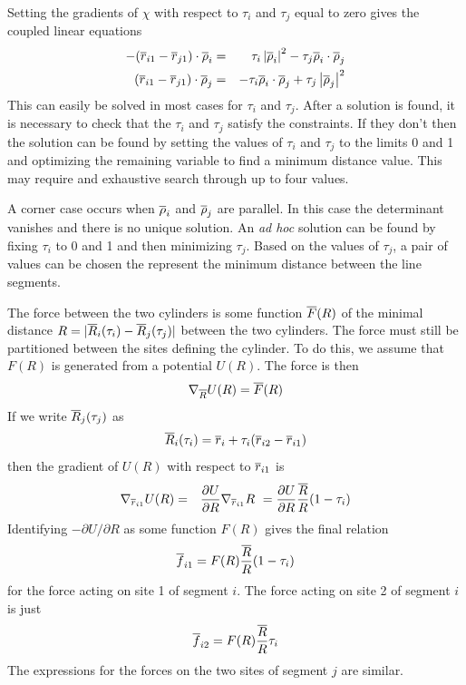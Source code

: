 \documentclass[12pt]{article}
\begin{document}
Setting the gradients of $\chi$ with respect to $\tau_i$ and $\tau_j$ equal to
zero gives the coupled linear equations
\begin{eqnarray*}
-(\overline{r}_{i1}-\overline{r}_{j1})\cdot\overline{\rho}_i & = & \tau_i\left|\overline{\rho}_i\right|^2
                                        - \tau_j\overline{\rho}_i\cdot\overline{\rho}_j \\
(\overline{r}_{i1}-\overline{r}_{j1})\cdot\overline{\rho}_j & = & - \tau_i\overline{\rho}_i\cdot\overline{\rho}_j
                                       + \tau_j\left|\overline{\rho}_j\right|^2
\end{eqnarray*}
This can easily be solved in most cases for $\tau_i$ and $\tau_j$.
After a solution is found, it is necessary to check that the $\tau_i$ and $\tau_j$
satisfy the constraints. If they don't then the solution can be found by setting the
values of $\tau_i$ and $\tau_j$ to the limits 0 and 1 and optimizing the remaining
variable to find a minimum distance value. This may require and exhaustive search through
up to four values.

A corner case occurs when $\overline{\rho}_i$ and $\overline{\rho}_j$ are parallel. In this case the
determinant vanishes and there is no unique solution. An {\em ad hoc} solution can be
found by fixing $\tau_i$ to 0 and 1 and then minimizing $\tau_j$. Based on the values
of $\tau_j$, a pair of values can be chosen the represent the minimum distance between
the line segments.

The force between the two cylinders is some function $\overline{F}(R)$ of the minimal
distance $R=|\overline{R}_i(\tau_i)-\overline{R}_j(\tau_j)|$ between the two cylinders. The
force must still be partitioned between the sites defining the cylinder. To do
this, we assume that $F(R)$ is generated from a potential $U(R)$. The force is
then
\[
\nabla_{\overline{R}}U(R) = \overline{F}(R)
\]
If we write $\overline{R}_j(\tau_j)$ as
\[
\overline{R}_i(\tau_i) = \overline{r}_i + \tau_i (\overline{r}_{i2}-\overline{r}_{i1})
\]
then the gradient of $U(R)$ with respect to $\overline{r}_{i1}$ is
\begin{eqnarray*}
\nabla_{\overline{r}_{i1}}U(R) & = & \frac{\partial U}{\partial R}\nabla_{\overline{r}_{i1}}R\
 = \frac{\partial U}{\partial R}\frac{\overline{R}}{R} (1-\tau_i)
\end{eqnarray*}
Identifying $-\partial U/\partial R$ as some function $F(R)$ gives the final
relation
\[
\overline{f}_{i1} = F(R)\frac{\overline{R}}{R}(1-\tau_i)
\]
for the force acting on site 1 of segment $i$. The force acting on site 2 of segment
$i$ is just
\[
\overline{f}_{i2} = F(R)\frac{\overline{R}}{R}\tau_i
\]
The expressions for the forces on the two sites of segment $j$ are similar.
\end{document}
